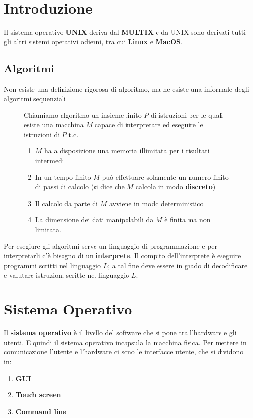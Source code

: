 \documentclass[a4paper]{article}
\begin{document}


\tableofcontents
\pagebreak

\section{Introduzione}
Il sistema operativo \textbf{UNIX} deriva dal \textbf{MULTIX} e da UNIX sono
derivati tutti gli altri sistemi operativi odierni, tra cui \textbf{Linux} e
\textbf{MacOS}.

\subsection{Algoritmi}
Non esiste una definizione rigorosa di algoritmo, ma ne esiste una informale degli
algoritmi sequenziali
\begin{figure}[H]
  \begin{definition}
    Chiamiamo algoritmo un insieme finito \( P \) di istruzioni per le quali esiste
    una macchina \( M \) capace di interpretare ed eseguire le istruzioni di \( P \) t.c.
    \begin{enumerate}
      \item \( M \) ha a disposizione una memoria illimitata per i risultati intermedi

      \item In un tempo finito \( M \) può effettuare solamente un numero finito di
        passi di calcolo (si dice che \( M \) calcola in modo \textbf{discreto})
        
      \item Il calcolo da parte di \( M \) avviene in modo deterministico
        
      \item La dimensione dei dati manipolabili da \( M \) è finita ma non limitata.
    \end{enumerate}
  \end{definition}
\end{figure}

\noindent
Per esegiure gli algoritmi serve un linguaggio di programmazione e per interpretarli
c'è bisogno di un \textbf{interprete}. Il compito dell'interprete è eseguire programmi
scritti nel linguaggio \( L \); a tal fine deve essere in grado di decodificare
e valutare istruzioni scritte nel linguaggio \( L \).

\section{Sistema Operativo}
Il \textbf{sistema operativo} è il livello del software che si pone tra l'hardware
e gli utenti. E quindi il sistema operativo incapsula la macchina fisica.
Per mettere in comunicazione l'utente e l'hardware ci sono le interfacce utente,
che si dividono in:
\begin{enumerate}
  \item \textbf{GUI}
  \item \textbf{Touch screen}
  \item \textbf{Command line}
\end{enumerate}
\end{document}
